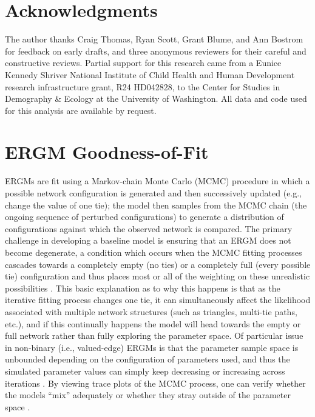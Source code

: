 \documentclass[12pt,a4paper,titlepage]{article}
\begin{document}
\section*{Acknowledgments}

The author thanks Craig Thomas, Ryan Scott, Grant Blume, and Ann Bostrom for feedback on early drafts, and three anonymous reviewers for their careful and constructive reviews. Partial support for this research came from a Eunice Kennedy Shriver National Institute of Child Health and Human Development research infrastructure grant, R24 HD042828, to the Center for Studies in Demography \& Ecology at the University of Washington. All data and code used for this analysis are available by request. 

\nocite{handcock2014-a,analytics2014,butts2014}

\printbibliography

\appendix
{}
\section{ERGM Goodness-of-Fit}
\label{appendix:gof}


ERGMs are fit using a Markov-chain Monte Carlo (MCMC) procedure in which a possible network configuration is generated and then successively updated (e.g., change the value of one tie); the model then samples from the MCMC chain (the ongoing sequence of perturbed configurations) to generate a distribution of configurations against which the observed network is compared. The primary challenge in developing a baseline model is ensuring that an ERGM does not become degenerate, a condition which occurs when the MCMC fitting processes cascades towards a completely empty (no ties) or a completely full (every possible tie) configuration and thus places most or all of the weighting on these unrealistic possibilities \parencite{handcock2003, kolaczyk2009}. This basic explanation as to why this happens is that as the iterative fitting process changes one tie, it can simultaneously affect the likelihood associated with multiple network structures (such as triangles, multi-tie paths, etc.), and if this continually happens the model will head towards the empty or full network rather than fully exploring the parameter space. Of particular issue in non-binary (i.e., valued-edge) ERGMs is that the parameter sample space is unbounded depending on the configuration of parameters used, and thus the simulated parameter values can simply keep decreasing or increasing across iterations \parencite{krivitsky2013}. By viewing trace plots of the MCMC process, one can verify whether the models “mix” adequately or whether they stray outside of the parameter space \parencite{krivitsky2012}.
\end{document}
